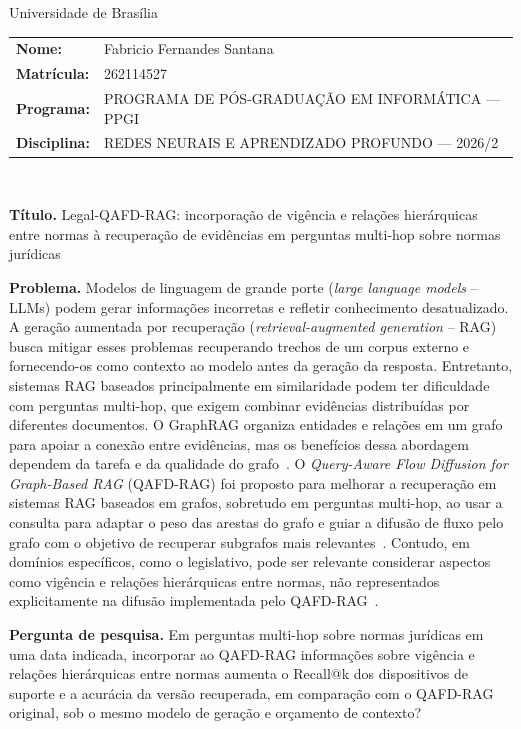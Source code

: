 \documentclass[11pt,a4paper]{article}
\begin{document}
\begin{center}
{\small Universidade de Brasília}\\[0.9em]
{\footnotesize
\begin{tabular}{@{}ll@{}}
\textbf{Nome:} & Fabricio Fernandes Santana\\
\textbf{Matrícula:} & 262114527 \\
\textbf{Programa:} & PROGRAMA DE PÓS-GRADUAÇÃO EM INFORMÁTICA — PPGI \\
\textbf{Disciplina:} & REDES NEURAIS E APRENDIZADO PROFUNDO  — 2026/2
\end{tabular}}\\[0.15em] 
\end{center}

\textbf{Título.} Legal-QAFD-RAG: incorporação de vigência e relações hierárquicas entre normas à recuperação de evidências em perguntas multi-hop sobre normas jurídicas

\textbf{Problema.} Modelos de linguagem de grande porte (\textit{large language models} -- LLMs) podem gerar informações incorretas e refletir conhecimento desatualizado. A geração aumentada por recuperação (\textit{retrieval-augmented generation} -- RAG) busca mitigar esses problemas recuperando trechos de um corpus externo e fornecendo-os como contexto ao modelo antes da geração da resposta. Entretanto, sistemas RAG baseados principalmente em similaridade podem ter dificuldade com perguntas multi-hop, que exigem combinar evidências distribuídas por diferentes documentos. O GraphRAG organiza entidades e relações em um grafo para apoiar a conexão entre evidências, mas os benefícios dessa abordagem dependem da tarefa e da qualidade do grafo~\cite{graphragbench}. O \textit{Query-Aware Flow Diffusion for Graph-Based RAG} (QAFD-RAG) foi proposto para melhorar a recuperação em sistemas RAG baseados em grafos, sobretudo em perguntas multi-hop, ao usar a consulta para adaptar o peso das arestas do grafo e guiar a difusão de fluxo pelo grafo com o objetivo de recuperar subgrafos mais relevantes~\cite{qafd}. Contudo, em domínios específicos, como o legislativo, pode ser relevante considerar aspectos como vigência e relações hierárquicas entre normas, não representados explicitamente na difusão implementada pelo QAFD-RAG~\cite{qafd}.

\textbf{Pergunta de pesquisa.} Em perguntas multi-hop sobre normas jurídicas em uma data indicada, incorporar ao QAFD-RAG informações sobre vigência e relações hierárquicas entre normas aumenta o Recall@k dos dispositivos de suporte e a acurácia da versão recuperada, em comparação com o QAFD-RAG original, sob o mesmo modelo de geração e orçamento de contexto?
\end{document}
